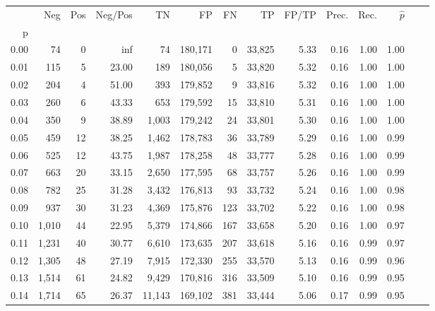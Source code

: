 \begin{tabular}{rrrrrrrrrrrrrr}
\toprule
{} &    Neg &  Pos & Neg/Pos &       TN &       FP &      FN &      TP & FP/TP & Prec. &  Rec. & $\hat{p}$ \\
p    &        &      &         &          &          &         &         &       &       &       &           \\
\midrule
0.00 &     74 &    0 &     inf &       74 &  180,171 &       0 &  33,825 &  5.33 &  0.16 &  1.00 &      1.00 \\
0.01 &    115 &    5 &   23.00 &      189 &  180,056 &       5 &  33,820 &  5.32 &  0.16 &  1.00 &      1.00 \\
0.02 &    204 &    4 &   51.00 &      393 &  179,852 &       9 &  33,816 &  5.32 &  0.16 &  1.00 &      1.00 \\
0.03 &    260 &    6 &   43.33 &      653 &  179,592 &      15 &  33,810 &  5.31 &  0.16 &  1.00 &      1.00 \\
0.04 &    350 &    9 &   38.89 &    1,003 &  179,242 &      24 &  33,801 &  5.30 &  0.16 &  1.00 &      1.00 \\
0.05 &    459 &   12 &   38.25 &    1,462 &  178,783 &      36 &  33,789 &  5.29 &  0.16 &  1.00 &      0.99 \\
0.06 &    525 &   12 &   43.75 &    1,987 &  178,258 &      48 &  33,777 &  5.28 &  0.16 &  1.00 &      0.99 \\
0.07 &    663 &   20 &   33.15 &    2,650 &  177,595 &      68 &  33,757 &  5.26 &  0.16 &  1.00 &      0.99 \\
0.08 &    782 &   25 &   31.28 &    3,432 &  176,813 &      93 &  33,732 &  5.24 &  0.16 &  1.00 &      0.98 \\
0.09 &    937 &   30 &   31.23 &    4,369 &  175,876 &     123 &  33,702 &  5.22 &  0.16 &  1.00 &      0.98 \\
0.10 &  1,010 &   44 &   22.95 &    5,379 &  174,866 &     167 &  33,658 &  5.20 &  0.16 &  1.00 &      0.97 \\
0.11 &  1,231 &   40 &   30.77 &    6,610 &  173,635 &     207 &  33,618 &  5.16 &  0.16 &  0.99 &      0.97 \\
0.12 &  1,305 &   48 &   27.19 &    7,915 &  172,330 &     255 &  33,570 &  5.13 &  0.16 &  0.99 &      0.96 \\
0.13 &  1,514 &   61 &   24.82 &    9,429 &  170,816 &     316 &  33,509 &  5.10 &  0.16 &  0.99 &      0.95 \\
0.14 &  1,714 &   65 &   26.37 &   11,143 &  169,102 &     381 &  33,444 &  5.06 &  0.17 &  0.99 &      0.95 \\

\end{tabular}
